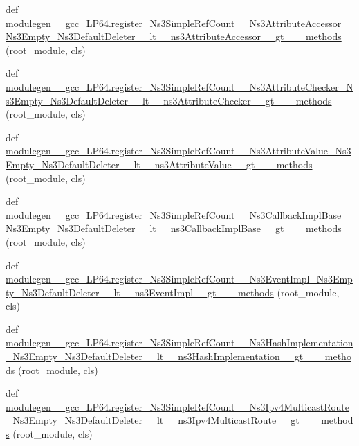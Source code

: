 \begin{DoxyCompactItemize}
\item 
def \hyperlink{namespacemodulegen____gcc__LP64_a9b358364d845a1ffcabb6be20a325b9d}{modulegen\+\_\+\+\_\+gcc\+\_\+\+L\+P64.\+register\+\_\+\+Ns3\+Simple\+Ref\+Count\+\_\+\+\_\+\+Ns3\+Attribute\+Accessor\+\_\+\+Ns3\+Empty\+\_\+\+Ns3\+Default\+Deleter\+\_\+\+\_\+lt\+\_\+\+\_\+ns3\+Attribute\+Accessor\+\_\+\+\_\+gt\+\_\+\+\_\+\+\_\+methods} (root\+\_\+module, cls)
\item 
def \hyperlink{namespacemodulegen____gcc__LP64_acc11c420e32471422fd00230d89398af}{modulegen\+\_\+\+\_\+gcc\+\_\+\+L\+P64.\+register\+\_\+\+Ns3\+Simple\+Ref\+Count\+\_\+\+\_\+\+Ns3\+Attribute\+Checker\+\_\+\+Ns3\+Empty\+\_\+\+Ns3\+Default\+Deleter\+\_\+\+\_\+lt\+\_\+\+\_\+ns3\+Attribute\+Checker\+\_\+\+\_\+gt\+\_\+\+\_\+\+\_\+methods} (root\+\_\+module, cls)
\item 
def \hyperlink{namespacemodulegen____gcc__LP64_abcd5829b1993ba7d28274b9959f71417}{modulegen\+\_\+\+\_\+gcc\+\_\+\+L\+P64.\+register\+\_\+\+Ns3\+Simple\+Ref\+Count\+\_\+\+\_\+\+Ns3\+Attribute\+Value\+\_\+\+Ns3\+Empty\+\_\+\+Ns3\+Default\+Deleter\+\_\+\+\_\+lt\+\_\+\+\_\+ns3\+Attribute\+Value\+\_\+\+\_\+gt\+\_\+\+\_\+\+\_\+methods} (root\+\_\+module, cls)
\item 
def \hyperlink{namespacemodulegen____gcc__LP64_abad80b77479df17974cc787f14a2406f}{modulegen\+\_\+\+\_\+gcc\+\_\+\+L\+P64.\+register\+\_\+\+Ns3\+Simple\+Ref\+Count\+\_\+\+\_\+\+Ns3\+Callback\+Impl\+Base\+\_\+\+Ns3\+Empty\+\_\+\+Ns3\+Default\+Deleter\+\_\+\+\_\+lt\+\_\+\+\_\+ns3\+Callback\+Impl\+Base\+\_\+\+\_\+gt\+\_\+\+\_\+\+\_\+methods} (root\+\_\+module, cls)
\item 
def \hyperlink{namespacemodulegen____gcc__LP64_a0545c365b0db77cf144c477216b1292c}{modulegen\+\_\+\+\_\+gcc\+\_\+\+L\+P64.\+register\+\_\+\+Ns3\+Simple\+Ref\+Count\+\_\+\+\_\+\+Ns3\+Event\+Impl\+\_\+\+Ns3\+Empty\+\_\+\+Ns3\+Default\+Deleter\+\_\+\+\_\+lt\+\_\+\+\_\+ns3\+Event\+Impl\+\_\+\+\_\+gt\+\_\+\+\_\+\+\_\+methods} (root\+\_\+module, cls)
\item 
def \hyperlink{namespacemodulegen____gcc__LP64_a38845cc78a4819d6d5632f27e6fd34d9}{modulegen\+\_\+\+\_\+gcc\+\_\+\+L\+P64.\+register\+\_\+\+Ns3\+Simple\+Ref\+Count\+\_\+\+\_\+\+Ns3\+Hash\+Implementation\+\_\+\+Ns3\+Empty\+\_\+\+Ns3\+Default\+Deleter\+\_\+\+\_\+lt\+\_\+\+\_\+ns3\+Hash\+Implementation\+\_\+\+\_\+gt\+\_\+\+\_\+\+\_\+methods} (root\+\_\+module, cls)
\item 
def \hyperlink{namespacemodulegen____gcc__LP64_af851a865b43e2f11b9cc67cef8b80985}{modulegen\+\_\+\+\_\+gcc\+\_\+\+L\+P64.\+register\+\_\+\+Ns3\+Simple\+Ref\+Count\+\_\+\+\_\+\+Ns3\+Ipv4\+Multicast\+Route\+\_\+\+Ns3\+Empty\+\_\+\+Ns3\+Default\+Deleter\+\_\+\+\_\+lt\+\_\+\+\_\+ns3\+Ipv4\+Multicast\+Route\+\_\+\+\_\+gt\+\_\+\+\_\+\+\_\+methods} (root\+\_\+module, cls)

\end{DoxyCompactItemize}
